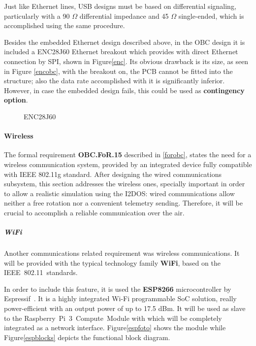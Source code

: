 Just like Ethernet lines, \acrshort{USB} designs must be based on differential signaling, particularly with a 90 $\Omega$ differential impedance and 45 $\Omega$ single-ended, which is accomplished using the same procedure.

Besides the embedded Ethernet design described above, in the \acrshort{OBC} design it is included a ENC28J60 \cite{enc28j60break} Ethernet breakout which provides with direct Ethernet connection by \acrshort{SPI}, shown in Figure\autoref{enc}. Its obvious drawback is its size, as seen in Figure \autoref{encobc}, with the breakout on, the \acrshort{PCB} cannot be fitted into the  structure; also the data rate accomplished with it is significantly inferior. However, in case the embedded design fails, this could be used as \textbf{contingency option}.

			\begin{figure}[H]
			\centering
			\quad
			\caption{ENC28J60} \label{sbcformats}
\end{figure}

\paragraph{Wireless}

The formal requirement \textbf{OBC.FoR.15} described in \autoref{forobc}, states the need for a wireless communication system, provided by an integrated device fully compatible with \acrshort{IEEE} 802.11g standard. After designing the wired communications subsystem, this section addresses the wireless ones, specially important in order to allow a realistic simulation using the \acrshort{I2DOS}: wired communications allow neither a free rotation nor a convenient telemetry sending. Therefore, it will be crucial to accomplish a reliable communication over the air.

\subparagraph{WiFi}
Another communications related requirement was wireless communications. It will be provided with the typical technology family \textbf{WiFi}, based on the \acrshort{IEEE}~802.11~standards.

In order to include this feature, it is used the \textbf{ESP8266} microcontroller by Espressif~\cite{espressif}. It is a highly integrated Wi-Fi programmable \acrshort{SoC} solution, really power-efficient with an output power of up to 17.5 dBm. It will be used as slave to the Raspberry~Pi~3~Compute~Module with which will be completely integrated as a network interface. Figure\autoref{espfoto} shows the module while Figure\autoref{espblocks} depicts the functional block diagram.




